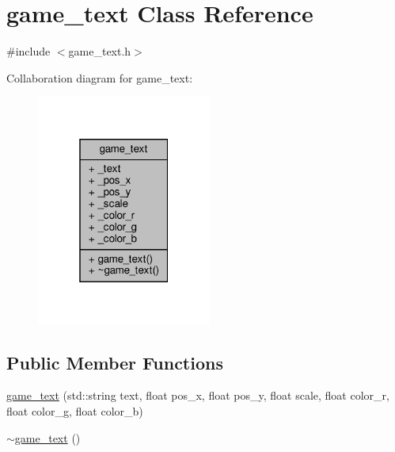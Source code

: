 \hypertarget{classgame__text}{}\section{game\+\_\+text Class Reference}
\label{classgame__text}


{\ttfamily \#include $<$game\+\_\+text.\+h$>$}



Collaboration diagram for game\+\_\+text\+:
\nopagebreak
\begin{figure}[H]
\begin{center}
\leavevmode
\includegraphics[width=163pt]{classgame__text__coll__graph}
\end{center}
\end{figure}
\subsection*{Public Member Functions}
\begin{DoxyCompactItemize}
\item 
\hyperlink{classgame__text_aeda16b6fac60f1d021bc0ff545771c15}{game\+\_\+text} (std\+::string text, float pos\+\_\+x, float pos\+\_\+y, float scale, float color\+\_\+r, float color\+\_\+g, float color\+\_\+b)
\item 
\hyperlink{classgame__text_a8ac8ab9bd95d07e4482ec2905b5084fc}{$\sim$game\+\_\+text} ()
\end{DoxyCompactItemize}
